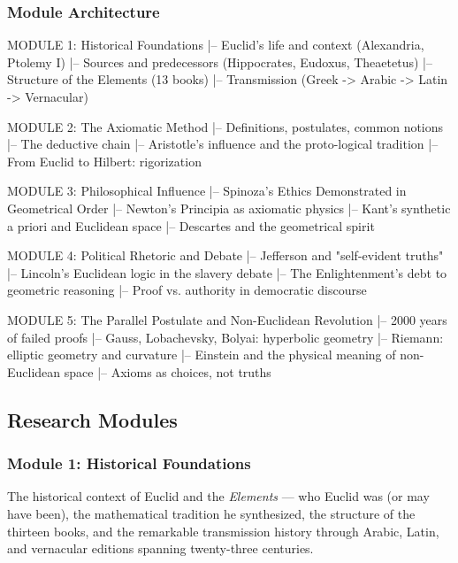 \documentclass[11pt,letterpaper]{article}
\begin{document}
\subsubsection{Module Architecture}

\begin{asciibox}
    MODULE 1: Historical Foundations
      |-- Euclid's life and context (Alexandria, Ptolemy I)
      |-- Sources and predecessors (Hippocrates, Eudoxus, Theaetetus)
      |-- Structure of the Elements (13 books)
      |-- Transmission (Greek -> Arabic -> Latin -> Vernacular)

    MODULE 2: The Axiomatic Method
      |-- Definitions, postulates, common notions
      |-- The deductive chain
      |-- Aristotle's influence and the proto-logical tradition
      |-- From Euclid to Hilbert: rigorization

    MODULE 3: Philosophical Influence
      |-- Spinoza's Ethics Demonstrated in Geometrical Order
      |-- Newton's Principia as axiomatic physics
      |-- Kant's synthetic a priori and Euclidean space
      |-- Descartes and the geometrical spirit

    MODULE 4: Political Rhetoric and Debate
      |-- Jefferson and "self-evident truths"
      |-- Lincoln's Euclidean logic in the slavery debate
      |-- The Enlightenment's debt to geometric reasoning
      |-- Proof vs. authority in democratic discourse

    MODULE 5: The Parallel Postulate and Non-Euclidean Revolution
      |-- 2000 years of failed proofs
      |-- Gauss, Lobachevsky, Bolyai: hyperbolic geometry
      |-- Riemann: elliptic geometry and curvature
      |-- Einstein and the physical meaning of non-Euclidean space
      |-- Axioms as choices, not truths
\end{asciibox}

\subsection{Research Modules}

\subsubsection{Module 1: Historical Foundations}
The historical context of Euclid and the \textit{Elements} --- who Euclid was (or may have been), the mathematical tradition he synthesized, the structure of the thirteen books, and the remarkable transmission history through Arabic, Latin, and vernacular editions spanning twenty-three centuries.
\end{document}

